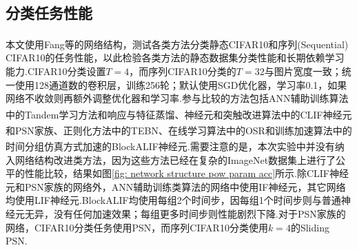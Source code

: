 \documentclass[10.5pt,compsoc,UTF8]{CjC}
\theoremstyle{mystyle}
\newcommand{\upcite}[1]{\textsuperscript{\cite{#1}}}
\begin{document}
\begin{multicols}{1}
\subsection{分类任务性能}
本文使用Fang等\upcite{fang2023parallel}的网络结构，测试各类方法分类静态CIFAR10和序列(Sequential) CIFAR10的任务性能，以此检验各类方法的静态数据集分类性能和长期依赖学习能力.CIFAR10分类设置$T=4$，而序列CIFAR10分类的$T=32$与图片宽度一致；统一使用128通道数的卷积层，训练256轮；默认使用SGD优化器，学习率0.1，如果网络不收敛则再额外调整优化器和学习率.参与比较的方法包括ANN辅助训练算法中的Tandem学习方法\upcite{wu2021tandem}和响应与特征蒸馏\upcite{xu2023constructing}、神经元和突触改进算法中的CLIF神经元\upcite{huang2024clif}和PSN家族\upcite{fang2023parallel}、正则化方法中的TEBN\upcite{duan2022temporal}、在线学习算法中的OSR\upcite{zhu2024online}和训练加速算法中的时间分组仿真方式加速的BlockALIF神经元\upcite{NEURIPS2023_b9f253c2}.需要注意的是，本次实验中并没有纳入网络结构改进类方法，因为这些方法已经在复杂的ImageNet数据集上进行了公平的性能比较，结果如图\ref{fig: network structure pow param acc}所示.除CLIF神经元和PSN家族的网络外，ANN辅助训练类算法的网络中使用IF神经元，其它网络均使用LIF神经元.BlockALIF均使用每组2个时间步，因每组1个时间步则与普通神经元无异，没有任何加速效果；每组更多时间步则性能剧烈下降.对于PSN家族的网络，CIFAR10分类任务使用PSN，而序列CIFAR10分类使用$k=4$的Sliding PSN.%


\end{multicols}
\end{document}
